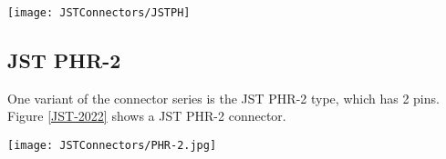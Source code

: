 \begin{center}
    \texttt{[image: JSTConnectors/JSTPH]}
\end{center}

\subsection{JST PHR-2}

One variant of the connector series is the JST PHR-2 type, which has 2 pins. Figure \ref{JST-2022} shows a JST PHR-2 connector.

\begin{center}
    \texttt{[image: JSTConnectors/PHR-2.jpg]}
    \label{JST-2022}
\end{center}

